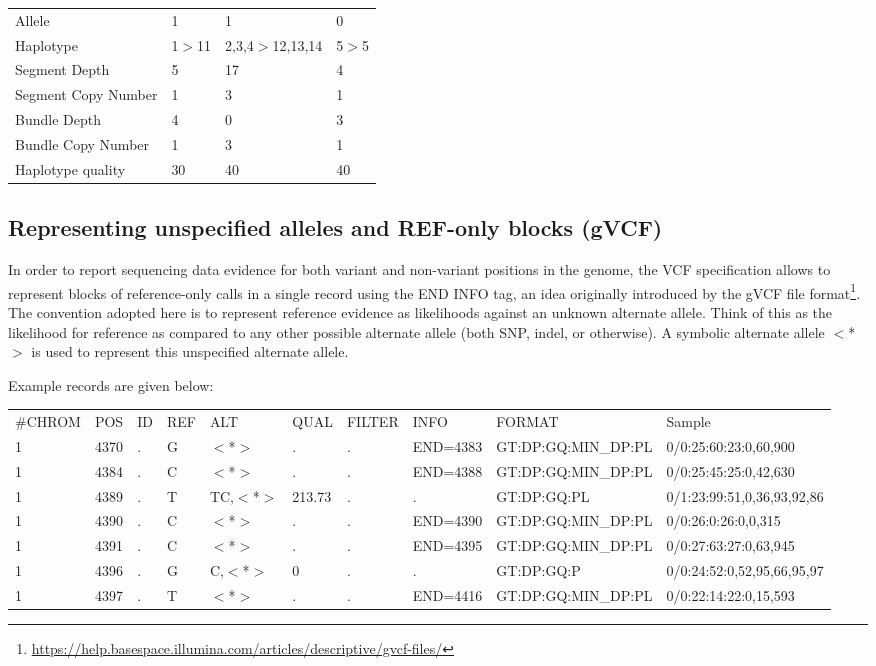 \documentclass[8pt]{article}
\begin{document}
\vspace{0.3cm}
\begin{tabular}{ l l l l }
Allele & 1 & 1 & 0 \\
Haplotype & 1$>$11 & 2,3,4$>$12,13,14 &	5$>$5 \\
Segment Depth & 5 & 17 & 4 \\
Segment Copy Number	& 1 & 3	& 1 \\
Bundle Depth & 4 & 0 & 3 \\
Bundle Copy Number & 1 & 3 & 1 \\
Haplotype quality & 30 & 40 & 40 \\
\end{tabular}

\pagebreak
\subsection{Representing unspecified alleles and REF-only blocks (gVCF)}
In order to report sequencing data evidence for both variant and non-variant positions in the genome, the VCF specification allows to represent blocks of reference-only calls in a single record using the END INFO tag, an idea originally introduced by the gVCF file format\footnote{\url{https://help.basespace.illumina.com/articles/descriptive/gvcf-files/}}.
The convention adopted here is to represent reference evidence as likelihoods against an unknown alternate allele.
Think of this as the likelihood for reference as compared to any other possible alternate allele (both SNP, indel, or otherwise).
A symbolic alternate allele $<$*$>$ is used to represent this unspecified alternate allele.

Example records are given below:
\scriptsize
\begin{flushleft}
\begin{tabular}{ l l l l l l l l l l }
\#CHROM & POS & ID & REF & ALT & QUAL & FILTER & INFO & FORMAT & Sample \\
1 & 4370 & . & G & $<$*$>$ & . & . & END=4383 & GT:DP:GQ:MIN\_DP:PL & 0/0:25:60:23:0,60,900 \\
1 & 4384 & . & C & $<$*$>$ & . & . & END=4388 & GT:DP:GQ:MIN\_DP:PL & 0/0:25:45:25:0,42,630 \\
1 & 4389 & . & T & TC,$<$*$>$ & 213.73 & . & . & GT:DP:GQ:PL & 0/1:23:99:51,0,36,93,92,86 \\
1 & 4390 & . & C & $<$*$>$ & . & . & END=4390 & GT:DP:GQ:MIN\_DP:PL & 0/0:26:0:26:0,0,315 \\
1 & 4391 & . & C & $<$*$>$ & . & . & END=4395 & GT:DP:GQ:MIN\_DP:PL & 0/0:27:63:27:0,63,945 \\
1 & 4396 & . & G & C,$<$*$>$ & 0 & . & . & GT:DP:GQ:P & 0/0:24:52:0,52,95,66,95,97 \\
1 & 4397 & . & T & $<$*$>$ & . & . & END=4416 & GT:DP:GQ:MIN\_DP:PL & 0/0:22:14:22:0,15,593 \\
\end{tabular}
\end{flushleft}
\normalsize
\end{document}
